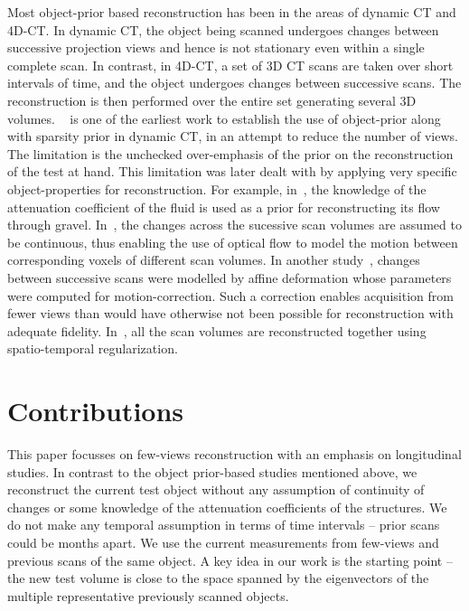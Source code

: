 \documentclass[journal]{IEEEtran}
\begin{document}

Most object-prior based reconstruction has been in the areas of
dynamic CT and 4D-CT. In dynamic CT, the object being scanned
undergoes changes between successive projection views and hence is not
stationary even within a single complete scan. In contrast, in 4D-CT,
a set of 3D CT scans are taken over short intervals of time, and the
object undergoes changes between successive scans.  The reconstruction
is then performed over the entire set generating several 3D
volumes. ~\cite{PICCS} is one of the earliest work to establish the
use of object-prior along with sparsity prior in dynamic CT, in an
attempt to reduce the number of views. The limitation is the
unchecked over-emphasis of the prior on the reconstruction of the test
at hand. This limitation was later dealt with by applying very
specific object-properties for reconstruction. For example,
in~\cite{Van2015}, the knowledge of the attenuation coefficient of the
fluid is used as a prior for reconstructing its flow through
gravel. In~\cite{Koen2020}, the changes across the sucessive scan
volumes are assumed to be continuous, thus enabling the use of optical
flow to model the motion between corresponding voxels of different
scan volumes. In another study~\cite{vincent2017}, changes between
successive scans were modelled by affine deformation whose parameters
were computed for motion-correction. Such a correction enables
acquisition from fewer views than would have otherwise not been
possible for reconstruction with adequate
fidelity. In~\cite{daniil2015}, all the scan volumes are reconstructed
together using spatio-temporal regularization.


\section{Contributions}
\label{sec:contributions}
This paper focusses on few-views reconstruction with an emphasis on
longitudinal studies. In contrast to the object prior-based studies mentioned
above, we reconstruct the current test object without any assumption
of continuity of changes or some knowledge of the attenuation
coefficients of the structures. We do not make any temporal assumption
in terms of time intervals -- prior scans could be months apart. We
use the current measurements from few-views and previous scans of the
same object. A key idea in our work is the starting point -- the new
test volume is close to the space spanned by the eigenvectors of the
multiple representative previously scanned objects.
\end{document}
